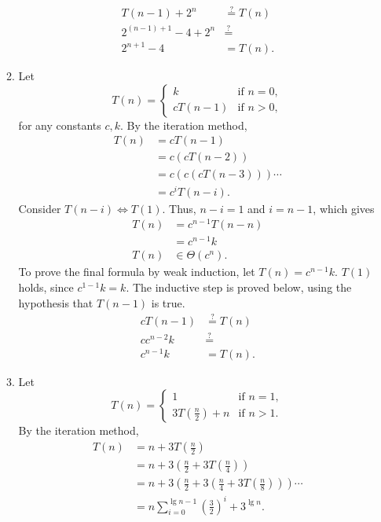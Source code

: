 \documentclass[12pt]{article}
\newcommand{\posseq}{\stackrel{?}{=}}
\begin{document}
\begin{enumerate}
\begin{enumerate}
    \begin{align*}
      T(n - 1) + 2^{n} &\posseq T(n) \\
      2^{(n - 1) + 1} - 4 + 2^{n} &\posseq \\
      2^{n + 1} - 4 &= T(n).
    \end{align*}
    \item\label{ex:4c} Let \[
      T(n) = \begin{cases}
        k &\text{if } n = 0, \\
        cT(n - 1) &\text{if } n > 0,
      \end{cases}
    \] for any constants $c, k$. By the iteration method,
    \begin{align*}
      T(n) &= cT(n - 1) \\
      &= c(cT(n - 2)) \\
      &= c(c(cT(n - 3))) \cdots \\
      &= c^{i} T(n - i).
    \end{align*}
    Consider $T(n - i) \Leftrightarrow T(1)$. Thus, $n - i = 1$ and $i = n - 1$, which gives
    \begin{align*}
      T(n) &= c^{n - 1} T(n - n)  \\
      &= c^{n - 1} k \\
      T(n) &\in \Theta(c^{n}).
    \end{align*}
    To prove the final formula by weak induction, let $T(n) = c^{n - 1} k$. $T(1)$ holds, since $c^{1 - 1} k = k$. The inductive step is proved below, using the hypothesis that $T(n - 1)$ is true.
    \begin{align*}
      cT(n - 1) &\posseq T(n) \\
      c c^{n - 2} k &\posseq \\
      c^{n - 1} k &= T(n). 
    \end{align*}
    \item\label{ex:4d} Let \[
      T(n) = \begin{cases}
        1 &\text{if } n = 1, \\
        3T(\frac{n}{2}) + n &\text{if } n > 1.
      \end{cases}
    \] By the iteration method,
    \begin{align*}
      T(n) &= n + 3T(\tfrac{n}{2}) \\
      &= n + 3(\tfrac{n}{2} + 3T(\tfrac{n}{4})) \\ 
      &= n + 3(\tfrac{n}{2} + 3(\tfrac{n}{4} + 3T(\tfrac{n}{8}))) \cdots \\
      &= n\sum_{i = 0}^{\lg n - 1} (\tfrac{3}{2})^{i} + 3^{\lg n}.

\end{align*}
\end{enumerate}
\end{enumerate}
\end{document}
